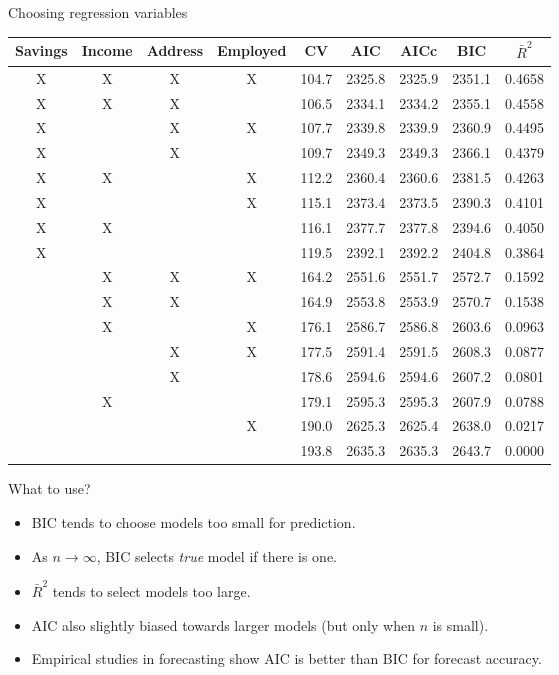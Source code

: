 \documentclass[14pt]{beamer}
\makeatletter
\def\biz{\begin{itemize}[<+-| alert@+>]}
\def\eiz{\end{itemize}}
\makeatother
\begin{document}
\begin{frame}{Choosing regression variables}\footnotesize\vspace*{-0.2cm}
{\tabcolsep=0.1cm
\hspace*{-0.7cm}\begin{tabular}{ccccccccc}
  \hline
 Savings & Income & Address & Employed & CV & AIC & AICc & BIC & $\bar{R}^2$ \\
  \hline
  X & X & X & X & 104.7 & 2325.8 & 2325.9 & 2351.1 & 0.4658 \\
  X & X & X &   & 106.5 & 2334.1 & 2334.2 & 2355.1 & 0.4558 \\
  X &   & X & X & 107.7 & 2339.8 & 2339.9 & 2360.9 & 0.4495 \\
  X &   & X &   & 109.7 & 2349.3 & 2349.3 & 2366.1 & 0.4379 \\
  X & X &   & X & 112.2 & 2360.4 & 2360.6 & 2381.5 & 0.4263 \\
  X &   &   & X & 115.1 & 2373.4 & 2373.5 & 2390.3 & 0.4101 \\
  X & X &   &   & 116.1 & 2377.7 & 2377.8 & 2394.6 & 0.4050 \\
  X &   &   &   & 119.5 & 2392.1 & 2392.2 & 2404.8 & 0.3864 \\
    & X & X & X & 164.2 & 2551.6 & 2551.7 & 2572.7 & 0.1592 \\
    & X & X &   & 164.9 & 2553.8 & 2553.9 & 2570.7 & 0.1538 \\
    & X &   & X & 176.1 & 2586.7 & 2586.8 & 2603.6 & 0.0963 \\
    &   & X & X & 177.5 & 2591.4 & 2591.5 & 2608.3 & 0.0877 \\
    &   & X &   & 178.6 & 2594.6 & 2594.6 & 2607.2 & 0.0801 \\
    & X &   &   & 179.1 & 2595.3 & 2595.3 & 2607.9 & 0.0788 \\
    &   &   & X & 190.0 & 2625.3 & 2625.4 & 2638.0 & 0.0217 \\
    &   &   &   & 193.8 & 2635.3 & 2635.3 & 2643.7 & 0.0000 \\
   \hline
\end{tabular}}

\end{frame}


\begin{frame}{What to use?}

\pause
\biz
\item BIC tends to choose models too small for prediction.

\item As $n\rightarrow\infty$, BIC selects \emph{true} model if there is one.

\item $\bar{R}^2$ tends to select models too large.

\item AIC also slightly biased towards larger models (but only when $n$ is small).

\item Empirical studies in forecasting show AIC is better than BIC for forecast accuracy.
\eiz
\end{frame}
\end{document}
